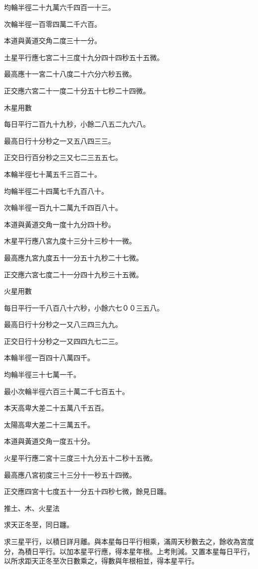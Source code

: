 \begin{pinyinscope}
均輪半徑二十九萬六千四百一十三。

次輪半徑一百零四萬二千六百。

本道與黃道交角二度三十一分。

土星平行應七宮二十三度十九分四十四秒五十五微。

最高應十一宮二十八度二十六分六秒五微。

正交應六宮二十一度二十分五十七秒二十四微。

木星用數

每日平行二百九十九秒，小餘二八五二九六八。

最高日行十分秒之一又五八四三三。

正交日行百分秒之三又七二三五五七。

本輪半徑七十萬五千三百二十。

均輪半徑二十四萬七千九百八十。

次輪半徑一百九十二萬九千四百八十。

本道與黃道交角一度十九分四十秒。

木星平行應八宮九度十三分十三秒十一微。

最高應九宮九度五十一分五十九秒二十七微。

正交應六宮七度二十一分四十九秒三十五微。

火星用數

每日平行一千八百八十六秒，小餘六七００三五八。

最高日行十分秒之一又八三四三九九。

正交日行十分秒之一又四四九七二三。

本輪半徑一百四十八萬四千。

均輪半徑三十七萬一千。

最小次輪半徑六百三十萬二千七百五十。

本天高卑大差二十五萬八千五百。

太陽高卑大差二十三萬五千。

本道與黃道交角一度五十分。

火星平行應二宮十三度三十九分五十二秒十五微。

最高應八宮初度三十三分十一秒五十四微。

正交應四宮十七度五十一分五十四秒七微，餘見日躔。

推土、木、火星法

求天正冬至，同日躔。

求三星平行，以積日詳月離。與本星每日平行相乘，滿周天秒數去之，餘收為宮度分，為積日平行。以加本星平行應，得本星年根。上考則減。又置本星每日平行，以所求距天正冬至次日數乘之，得數與年根相並，得本星平行。


\end{pinyinscope}
